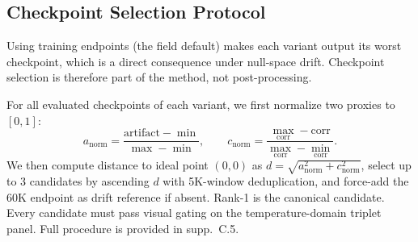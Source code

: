 \subsection{Checkpoint Selection Protocol}

Using training endpoints (the field default) makes each variant output its worst checkpoint, which is a direct consequence under null-space drift. Checkpoint selection is therefore part of the method, not post-processing.

For all evaluated checkpoints of each variant, we first normalize two proxies to $[0,1]$:
\[
a_{\mathrm{norm}}=\frac{\text{artifact}-\min}{\max-\min},\qquad
c_{\mathrm{norm}}=\frac{\max_{\mathrm{corr}}-\text{corr}}{\max_{\mathrm{corr}}-\min_{\mathrm{corr}}}.
\]
We then compute distance to ideal point $(0,0)$ as $d=\sqrt{a_{\mathrm{norm}}^2+c_{\mathrm{norm}}^2}$, select up to 3 candidates by ascending $d$ with 5K-window deduplication, and force-add the 60K endpoint as drift reference if absent. Rank-1 is the canonical candidate. Every candidate must pass visual gating on the temperature-domain triplet panel. Full procedure is provided in supp.~C.5.

